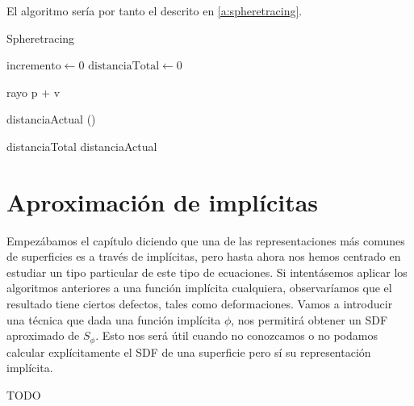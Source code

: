 El algoritmo sería por tanto el descrito en \autoref{a:spheretracing}. 
\begin{algorithm}[hbt!]\label{a:spheretracing}
    \caption{Spheretracing}\label{alg:spheretracing}
    $\text{incremento} \gets 0$\;
    $\text{distanciaTotal} \gets 0$\;
    
     {
        rayo \gets p + \cdot v\;
        
        distanciaActual \gets \phi()\;
        

        distanciaTotal \mathrel{{+}{=}} distanciaActual\;

    }
\end{algorithm}

\section{Aproximación de implícitas}
Empezábamos el capítulo diciendo que una de las representaciones más comunes de superficies es a través de implícitas, pero hasta ahora nos hemos centrado en estudiar un tipo particular de este tipo de ecuaciones. Si intentásemos aplicar los algoritmos anteriores a una función implícita cualquiera, observaríamos que el resultado tiene ciertos defectos, tales como deformaciones. Vamos a introducir una técnica que dada una función implícita $\phi$, nos permitirá obtener un SDF aproximado de $S_\phi$. Esto nos será útil cuando no conozcamos o no podamos calcular explícitamente el SDF de una superficie pero sí su representación implícita.

TODO

